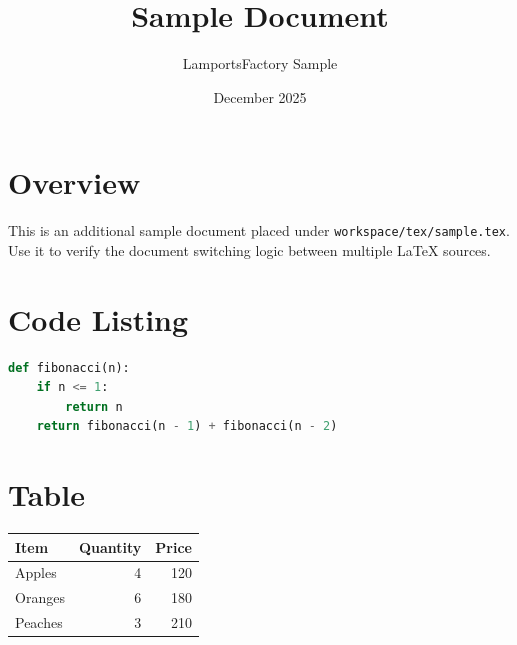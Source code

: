 \documentclass[a4paper]{article}
\title{Sample Document}
\author{LamportsFactory Sample}
\date{December 2025}
\begin{document}
\maketitle

\section{Overview}
This is an additional sample document placed under \verb|workspace/tex/sample.tex|. Use it to verify the document switching logic between multiple \LaTeX{} sources.

\section{Code Listing}
\begin{lstlisting}[language=Python]
def fibonacci(n):
    if n <= 1:
        return n
    return fibonacci(n - 1) + fibonacci(n - 2)
\end{lstlisting}

\section{Table}
\begin{tabular}{lrr}
\hline
Item & Quantity & Price\\
\hline
Apples & 4 & 120\\
Oranges & 6 & 180\\
Peaches & 3 & 210\\
\hline
\end{tabular}
\end{document}
